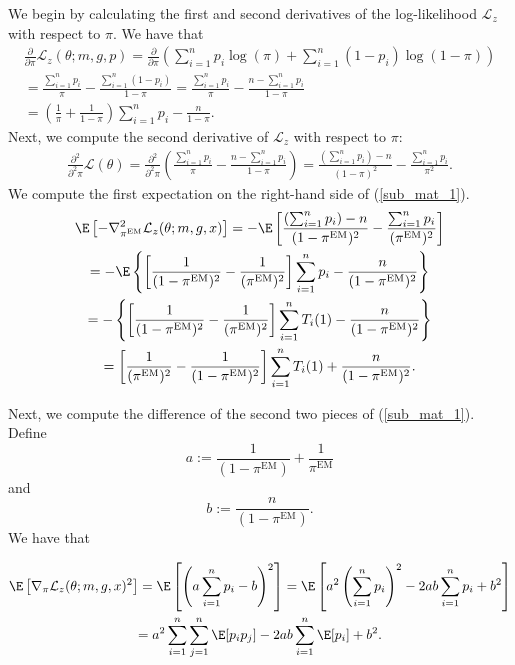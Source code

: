 \documentclass[12pt]{article}
\begin{document}
We begin by calculating the first and second derivatives of the log-likelihood $\mathcal{L}_z$ with respect to $\pi$. We have that
\begin{multline*}
\frac{\partial }{\partial \pi } \mathcal{L}_z(\theta; m, g, p) = \frac{\partial }{\partial \pi } \left( \sum_{i=1}^n p_i \log(\pi) + \sum_{i=1}^n (1 - p_i) \log(1 - \pi) \right) \\ = \frac{ \sum_{i=1}^n p_i }{\pi} - \frac{ \sum_{i=1}^n (1 - p_i) }{ 1 - \pi } = \frac{\sum_{i=1}^n p_i}{\pi} - \frac{n - \sum_{i=1}^n p_i}{1 - \pi} \\ = \left( \frac{1}{\pi} + \frac{1}{1 - \pi} \right) \sum_{i=1}^n p_i - \frac{n}{1-\pi}.
\end{multline*}
Next, we compute the second derivative of $\mathcal{L}_z$ with respect to $\pi$:
\begin{multline*}
\frac{\partial^2}{\partial^2\pi} \mathcal{L}(\theta)  = \frac{\partial^2}{\partial^2\pi} \left( \frac{ \sum_{i=1}^n p_i }{ \pi } - \frac{ n - \sum_{i=1}^n p_i }{1 - \pi}  \right) = \frac{\left( \sum_{i=1}^n p_i \right) - n}{(1 - \pi)^2} - \frac{\sum_{i=1}^n p_i }{ \pi^2 }.
\end{multline*}
We compute the first expectation on the right-hand side of (\ref{sub_mat_1}).
\begin{multline*}
\E \left[ - \nabla^2_{\pi^{\textrm{EM}}} \mathcal{L}_z(\theta; m, g, x)\right] = - \E \left[ \frac{ ( \sum_{i=1}^n p_i) - n}{ (1 - \pi^{\textrm{EM}})^2} - \frac{ \sum_{i=1}^n p_i}{(\pi^{\textrm{EM}})^2} \right] \\ = - \E\left\{ \left[ \frac{1}{(1-\pi^{\textrm{EM}})^2} - \frac{1}{(\pi^{\textrm{EM}})^2} \right] \sum_{i=1}^n p_i - \frac{n}{ (1 - \pi^{\textrm{EM}})^2 } \right\} \\ = - \left\{ \left[ \frac{1}{(1-\pi^{\textrm{EM}})^2} - \frac{1}{(\pi^{\textrm{EM}})^2} \right] \sum_{i=1}^n T_i(1) - \frac{n}{ (1 - \pi^{\textrm{EM}})^2}  \right\} \\ = \left[ \frac{1}{(\pi^{\textrm{EM}})^2} - \frac{1}{ (1 - \pi^{\textrm{EM}})^2} \right] \sum_{i=1}^n T_i(1) + \frac{n}{(1-\pi^{\textrm{EM}})^2}.
\end{multline*}

Next, we compute the difference of the second two pieces of (\ref{sub_mat_1}). Define $$a := \frac{1}{(1-\pi^{\textrm{EM}})} + \frac{1}{\pi^{\textrm{EM}}}$$ and $$b := \frac{n}{(1-\pi^{\textrm{EM}})}.$$ We have that

\begin{multline*}
\E \left[ \nabla_\pi \mathcal{L}_z(\theta; m, g, x)^2 \right] = \E \left[ \left( a \sum_{i=1}^n p_i - b\right)^2 \right] =  \E \left[ a^2 \left( \sum_{i=1}^n p_i \right)^2 - 2ab \sum_{i=1}^n p_i + b^2 \right] \\ = a^2 \sum_{i=1}^n \sum_{j=1}^n \E[p_i p_j] -2ab \sum_{i=1}^n \E [p_i] + b^2.
\end{multline*}
\end{document}
